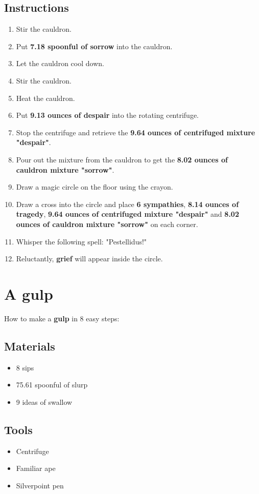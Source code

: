 \documentclass{article}
\begin{document}
\subsection{Instructions}\begin{enumerate}
\item 
Stir the cauldron.
\item 
Put \textbf{7.18 spoonful of sorrow} into the cauldron.
\item 
Let the cauldron cool down.
\item 
Stir the cauldron.
\item 
Heat the cauldron.
\item 
Put \textbf{9.13 ounces of despair} into the rotating centrifuge.
\item 
Stop the centrifuge and retrieve the \textbf{9.64 ounces of centrifuged mixture "despair"}.
\item 
Pour out the mixture from the cauldron to get the \textbf{8.02 ounces of cauldron mixture "sorrow"}.
\item 
Draw a magic circle on the floor using the crayon.
\item 
Draw a cross into the circle and place \textbf{6 sympathies}, \textbf{8.14 ounces of tragedy}, \textbf{9.64 ounces of centrifuged mixture "despair"} and \textbf{8.02 ounces of cauldron mixture "sorrow"} on each corner.
\item 
Whisper the following spell: "Pestellidus!"
\item 
Reluctantly, \textbf{grief} will appear inside the circle.
\end{enumerate}
\newpage
\section{A gulp}How to make a \textbf{gulp} in 8 easy steps:

\subsection{Materials}\begin{itemize}
\item 
8 sips
\item 
75.61 spoonful of slurp
\item 
9 ideas of swallow
\end{itemize}
\subsection{Tools}\begin{itemize}
\item 
Centrifuge
\item 
Familiar ape
\item 
Silverpoint pen
\end{itemize}
\end{document}
